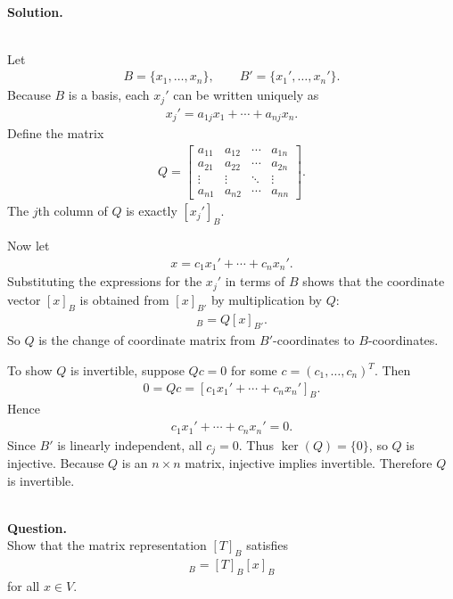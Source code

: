 \documentclass{article}
\begin{document}
\noindent\\
\textbf{Solution.}\\
\quad\\
\begin{mdframed}[linewidth=1pt]
Let
\begin{align*}
B=\{x_1,\dots,x_n\},\qquad B'=\{x_1',\dots,x_n'\}.
\end{align*}
Because $B$ is a basis, each $x_j'$ can be written uniquely as
\begin{align*}
x_j'=a_{1j}x_1+\cdots+a_{nj}x_n.
\end{align*}
Define the matrix
\begin{align*}
Q=\begin{bmatrix}
a_{11} & a_{12} & \cdots & a_{1n} \\
a_{21} & a_{22} & \cdots & a_{2n} \\
\vdots & \vdots & \ddots & \vdots \\
a_{n1} & a_{n2} & \cdots & a_{nn}
\end{bmatrix}.
\end{align*}
The $j$th column of $Q$ is exactly $[x_j']_B$.

Now let
\begin{align*}
x=c_1x_1'+\cdots+c_nx_n'.
\end{align*}
Substituting the expressions for the $x_j'$ in terms of $B$ shows that the coordinate vector $[x]_B$ is obtained from $[x]_{B'}$ by multiplication by $Q$:
\begin{align*}
[x]_B=Q[x]_{B'}.
\end{align*}
So $Q$ is the change of coordinate matrix from $B'$-coordinates to $B$-coordinates.

To show $Q$ is invertible, suppose $Qc=0$ for some $c=(c_1,\dots,c_n)^T$. Then
\begin{align*}
0=Qc=[c_1x_1'+\cdots+c_nx_n']_B.
\end{align*}
Hence
\begin{align*}
c_1x_1'+\cdots+c_nx_n'=0.
\end{align*}
Since $B'$ is linearly independent, all $c_j=0$. Thus $\ker(Q)=\{0\}$, so $Q$ is injective. Because $Q$ is an $n\times n$ matrix, injective implies invertible. Therefore $Q$ is invertible.
\end{mdframed}

\bigskip


\hfill \break  $~\!\!$ \dotfill \medskip \\
\textbf{Question.}\\
Show that the matrix representation $[T]_B$ satisfies
\begin{align*}
[T(x)]_B = [T]_B [x]_B
\end{align*}
for all $x \in V$.
\end{document}
